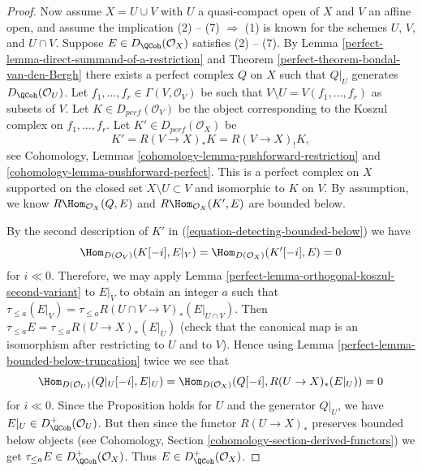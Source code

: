 \begin{proof}
\medskip\noindent
Now assume $X = U \cup V$ with $U$ a quasi-compact open of $X$ and
$V$ an affine open, and assume the implication (2) -- (7) $\Rightarrow$ (1)
is known for the schemes $U$, $V$, and $U \cap V$.
Suppose $E \in D_\QCoh(\mathcal{O}_X)$ satisfies (2) -- (7).
By Lemma \ref{perfect-lemma-direct-summand-of-a-restriction} and
Theorem \ref{perfect-theorem-bondal-van-den-Bergh} there exists a perfect
complex $Q$ on $X$ such that $Q|_U$ generates $D_\QCoh (\mathcal{O}_U)$.
Let $f_1, \dots , f_r \in \Gamma (V, \mathcal{O}_V)$
be such that $V \setminus U = V(f_1, \dots , f_r)$ as subsets of
$V$. Let $K \in D_{perf}(\mathcal{O}_V)$ be the object
corresponding to the Koszul complex on $f_1, \dots , f_r$.
Let $K' \in D_{perf}(\mathcal{O}_X)$ be
\begin{equation}
\label{equation-detecting-bounded-below}
K' = R (V \to X)_* K = R (V \to X)_! K,
\end{equation}
see Cohomology, Lemmas \ref{cohomology-lemma-pushforward-restriction} and
\ref{cohomology-lemma-pushforward-perfect}. This is a perfect
complex on $X$ supported on the closed set $X \setminus U \subset V$
and isomorphic to $K$ on $V$. By assumption, we know
$R\Hom_{\mathcal{O}_X}(Q, E)$ and
$R\Hom_{\mathcal{O}_X}(K', E)$ are bounded below.

\medskip\noindent
By the second description of $K'$ in (\ref{equation-detecting-bounded-below})
we have
$$
\Hom_{D(\mathcal{O}_V)}(K[-i], E|_V) = \Hom_{D(\mathcal{O}_X)}(K'[-i], E) = 0
$$
for $i \ll 0$. Therefore, we may apply
Lemma \ref{perfect-lemma-orthogonal-koszul-second-variant} to $E|_V$ to
obtain an integer $a$ such that
$\tau_{\leq a}(E|_V) = \tau_{\leq a} R(U \cap V \to V)_*(E|_{U \cap V})$.
Then $\tau_{\leq a} E = \tau_{\leq a} R(U \to X)_*(E|_U)$
(check that the canonical map is an isomorphism after restricting to
$U$ and to $V$). Hence using Lemma \ref{perfect-lemma-bounded-below-truncation}
twice we see that
$$
\Hom_{D(\mathcal{O}_U)}(Q|_U [-i], E|_U) =
\Hom_{D(\mathcal{O}_X)}(Q[-i], R (U \to X)_* (E|_U)) = 0
$$
for $i \ll 0$. Since the Proposition holds for $U$ and the generator
$Q|_U$, we have $E|_U \in D^+_\QCoh (\mathcal{O}_U)$. But then since
the functor $R(U \to X)_*$ preserves bounded below objects
(see Cohomology, Section \ref{cohomology-section-derived-functors}) we get
$\tau_{\leq a} E \in D^+_\QCoh(\mathcal{O}_X)$. Thus
$E \in D^+_\QCoh (\mathcal{O}_X)$.
\end{proof}

